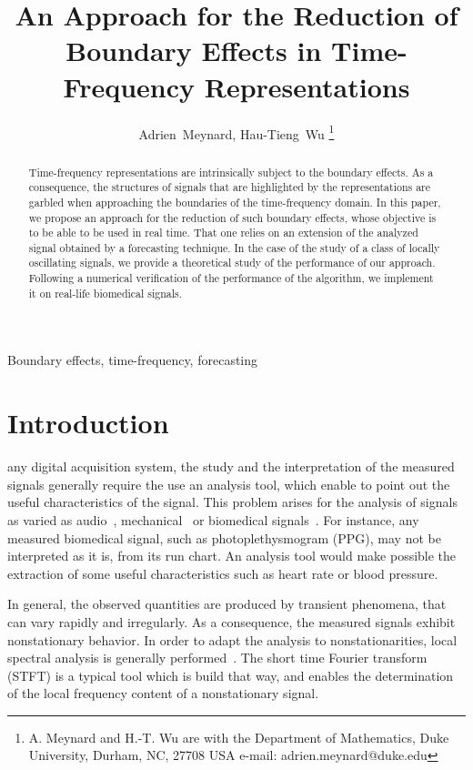 \documentclass[journal]{IEEEtran}
\title{An Approach for the Reduction of Boundary Effects in Time-Frequency Representations}
\author{Adrien~Meynard, %
        Hau-Tieng~Wu
\thanks{A. Meynard and H.-T. Wu are with the Department
of Mathematics, Duke University, Durham,
NC, 27708 USA e-mail: adrien.meynard@duke.edu}}
\begin{document}
\maketitle

\begin{abstract}
Time-frequency representations are intrinsically subject to the boundary effects. As a consequence, the structures of signals that are highlighted by the representations are garbled when approaching the boundaries of the time-frequency domain. In this paper, we propose an approach for the reduction of such boundary effects, whose objective is to be able to be used in real time. That one relies on an extension of the analyzed signal obtained by a forecasting technique. In the case of the study of a class of locally oscillating signals, we provide a theoretical study of the performance of our approach. Following a numerical verification of the performance of the algorithm, we implement it on real-life biomedical signals.
\end{abstract}

\begin{IEEEkeywords}
Boundary effects, time-frequency, forecasting
\end{IEEEkeywords}

\section{Introduction}
\label{se:introduction}
 any digital acquisition system, the study and the interpretation of the measured signals generally require the use an analysis tool, which enable to point out the useful characteristics of the signal. This problem arises for the analysis of signals as varied as audio~\cite{Stowell18computational,Muller11signal}, mechanical~\cite{Peng02vibration} or biomedical signals~\cite{Akay96detection}. For instance, any  measured biomedical signal, such as photoplethysmogram (PPG), may not be interpreted as it is, from its run chart. An analysis tool would make possible the extraction of some useful characteristics such as heart rate or blood pressure. 

In general, the observed quantities are produced by transient phenomena, that can vary rapidly and irregularly. As a consequence, the measured signals exhibit nonstationary behavior. In order to adapt the analysis to nonstationarities, local spectral analysis is generally performed~\cite{Stoica05spectral,Matz97generalized}. The short time Fourier transform~\cite{Grochenig01foundations} (STFT) is a typical tool which is build that way, and enables the determination of the local frequency content of a nonstationary signal.
\end{document}
